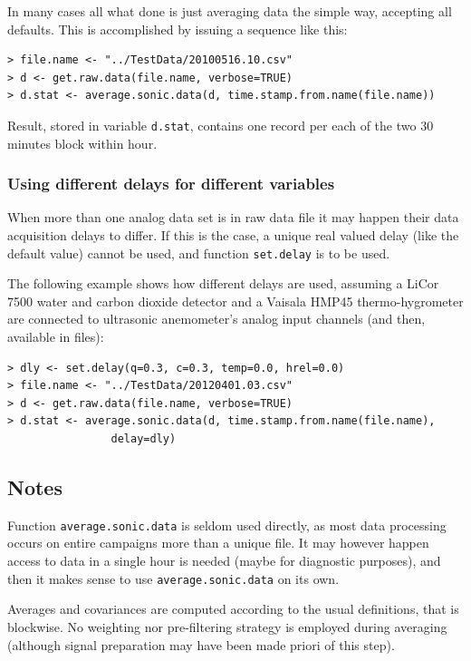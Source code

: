 \documentclass[a4paper,10pt]{book}
\begin{document}
In many cases all what done is just averaging data the simple way, accepting all defaults. This is accomplished by issuing a sequence like this:

\begin{verbatim}
> file.name <- "../TestData/20100516.10.csv"
> d <- get.raw.data(file.name, verbose=TRUE)
> d.stat <- average.sonic.data(d, time.stamp.from.name(file.name))
\end{verbatim} 

Result, stored in variable \verb|d.stat|, contains one record per each of the two 30 minutes block within hour.

\subsubsection{Using different delays for different variables}

When more than one analog data set is in raw data file it may happen their data acquisition delays to differ. If this is the case, a unique real valued delay (like the default value) cannot be used, and function \verb|set.delay| is to be used.

The following example shows how different delays are used, assuming a LiCor 7500 water and carbon dioxide detector and a Vaisala HMP45 thermo-hygrometer are connected to ultrasonic anemometer's analog input channels (and then, available in files):

\begin{verbatim}
> dly <- set.delay(q=0.3, c=0.3, temp=0.0, hrel=0.0)
> file.name <- "../TestData/20120401.03.csv"
> d <- get.raw.data(file.name, verbose=TRUE)
> d.stat <- average.sonic.data(d, time.stamp.from.name(file.name),
                delay=dly)
\end{verbatim} 


\subsection{Notes}

Function \verb|average.sonic.data| is seldom used directly, as most data processing occurs on entire campaigns more than a unique file. It may however happen access to data in a single hour is needed (maybe for diagnostic purposes), and then it makes sense to use \verb|average.sonic.data| on its own.

Averages and covariances are computed according to the usual definitions, that is blockwise. No weighting nor pre-filtering strategy is employed during averaging (although signal preparation may have been made priori of this step).
\end{document}

